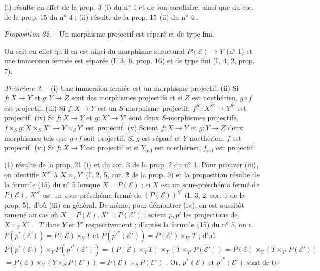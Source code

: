 \newpage


(i) résulte en effet de la prop. 3 (i) du n° 1 et de son corollaire, ainsi que du cor. de la prop. 15 du n° 4 ; (ii) résulte de la prop. 15 (ii) du n° 4 .

\emph{Proposition 22}. -- Un morphisme projectif est séparé et de type fini.

On sait en effet qu'il en est ainsi du morphisme structural $P(\mathcal{E}) \to Y$ (n° 1) et une immersion fermée est séparée (I, 3, 6, prop. 16) et de type fini (I, 4, 2, prop. 7).

\emph{Théorème 3}. -- (i) Une immersion fermée est un morphisme projectif.
(ii) Si $f: X \to Y$ et $g: Y \to Z$ sont des morphismes projectifs et si $Z$ est noethérien, $g \circ f$ est projectif.
(iii) Si $f: X \to Y$ est un $S$-morphisme projectif, $f^{S'}: X^{S'} \to Y^{S'}$ est projectif.
(iv) Si $f: X \to Y$ et $g: X' \to Y'$ sont deux $S$-morphismes projectifs, $f \times_S g: X \times_S X' \to Y \times_S Y'$ est projectif.
(v) Soient $f: X \to Y$ et $g: Y \to Z$ deux morphismes tels que $g \circ f$ soit projectif. Si $g$ est séparé et $Y$ noethérien, $f$ est projectif.
(vi) Si $f: X \to Y$ est projectif et si $Y_{\text{red}}$ est noethérien, $f_{\text{red}}$ est projectif.

(1) résulte de la prop. 21 (i) et du cor. 3 de la prop. 2 du n° 1. Pour prouver (iii), on identifie $X^{S'}$ à $X \times_Y Y'$ (I, 2, 5, cor. 2 de la prop. 9) et la proposition résulte de la formule (15) du n° 5 lorsque $X = P(\mathcal{E})$ ; si $X$ est un sous-préschéma fermé de $P(\mathcal{E})$, $X^{S'}$ est un sous-préschéma fermé de $(P(\mathcal{E}))^{S'}$ (I, 3, 2, cor. 1 de la prop. 5), d'où (iii) en général. De même, pour démontrer (iv), on est aussitôt ramené au cas où $X = P(\mathcal{E}), X' = P(\mathcal{E}')$ ; soient $p, p'$ les projections de $X \times_S X' = T$ dans $Y$ et $Y'$ respectivement ; d'après la formule (15) du n° 5, on a $P(p^*(\mathcal{E})) = P(\mathcal{E}) \times_Y T$ et $P(p'^*(\mathcal{E}')) = P(\mathcal{E}') \times_{Y'} T$ ; d'où
$$P(p^*(\mathcal{E})) \times_T P(p'^*(\mathcal{E}')) = (P(\mathcal{E}) \times_Y T) \times_T (T \times_{Y'} P(\mathcal{E}')) = P(\mathcal{E}) \times_Y (T \times_{Y'} P(\mathcal{E}'))$$
$$= P(\mathcal{E}) \times_Y (Y \times_S P(\mathcal{E}')) = P(\mathcal{E}) \times_S P(\mathcal{E}') \text{ . Or, } p^*(\mathcal{E}) \text{ et } p'^*(\mathcal{E}') \text{ sont de ty-}$$

\newpage

